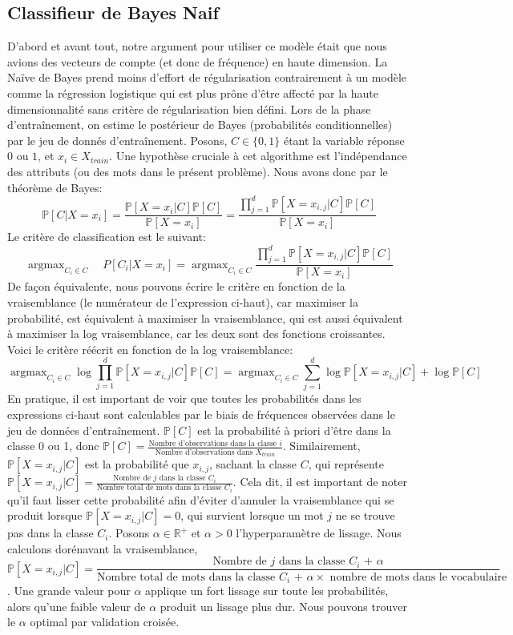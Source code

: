 \documentclass{article}
\DeclareMathOperator*{\argmax}{argmax}
\begin{document}
\subsection{Classifieur de Bayes Naif}
D'abord et avant tout, notre argument pour utiliser ce modèle était que nous avions des vecteurs de compte (et donc de fréquence) en haute dimension. La Naïve de Bayes prend moins d'effort de régularisation contrairement à un modèle comme la régression logistique qui est plus prône d'être affecté par la haute dimensionnalité sans critère de régularisation bien défini.
Lors de la phase d'entraînement, on estime le postérieur de Bayes (probabilités conditionnelles) par le jeu de donnés d'entraînement. Posons, $C \in \{0, 1\}$ étant la variable réponse $0$ ou $1$, et $x_i \in X_{train}$. Une hypothèse cruciale à cet algorithme est l'indépendance des attributs (ou des mots dans le présent problème). Nous avons donc par le théorème de Bayes:\\
$$\mathbb{P}[C | X=x_i] = \frac{\mathbb{P}[X = x_{i}| C]\mathbb{P}[C]}{\mathbb{P}[X = x_i]} =  \frac{\prod_{j = 1}^{d}\mathbb{P}[X = x_{i,j}| C]\mathbb{P}[C]}{\mathbb{P}[X = x_i]}$$
Le critère de classification est le suivant:
$$\argmax_{C_i \in C} \quad P[C_i | X = x_i] = \argmax_{C_i \in C} \frac{\prod_{j = 1}^{d}\mathbb{P}[X = x_{i,j}| C]\mathbb{P}[C]}{\mathbb{P}[X = x_i]}$$
De façon équivalente, nous pouvons écrire le critère en fonction de la vraisemblance (le numérateur de l'expression ci-haut), car maximiser la probabilité, est équivalent à maximiser la vraisemblance, qui est aussi équivalent à maximiser la log vraisemblance, car les deux sont des fonctions croissantes. Voici le critère réécrit en fonction de la log vraisemblance:
$$\argmax_{C_i \in C} \log{\prod_{j = 1}^{d}\mathbb{P}[X = x_{i,j}| C]\mathbb{P}[C]} = \argmax_{C_i \in C} \sum_{j = 1}^{d} \log{\mathbb{P}[X = x_{i,j}| C]} + \log{\mathbb{P}[C]}$$
En pratique, il est important de voir que toutes les probabilités dans les expressions ci-haut sont calculables par le biais de fréquences observées dans le jeu de données d'entraînement. $\mathbb{P}[C]$ est la probabilité à priori d'être dans la classe 0 ou 1, donc $\mathbb{P}[C] = \frac{\text{Nombre d'observations dans la classe $i$}}{\text{Nombre d'observations dans $X_{train}$}}$. Similairement, $\mathbb{P}[X = x_{i, j}| C]$ est la probabilité que $x_{i, j}$, sachant la classe $C$, qui représente $\mathbb{P}[X = x_{i, j}| C] = \frac{\text{Nombre de $j$ dans la classe $C_i$}}{\text{Nombre total de mots dans la classe $C_i$}}$. Cela dit, il est important de noter qu'il faut lisser cette probabilité afin d'éviter d'annuler la vraisemblance qui se produit lorsque $\mathbb{P}[X = x_{i, j}| C] = 0$, qui survient lorsque un mot $j$ ne se trouve pas dans la classe $C_i$. Posons $\alpha \in \mathbb{R}^{+}$ et $\alpha > 0$ l'hyperparamètre de lissage. Nous calculons dorénavant la vraisemblance, $$\mathbb{P}[X = x_{i, j}| C] = \frac{\text{Nombre de $j$ dans la classe $C_i$ + $\alpha$}}{\text{Nombre total de mots dans la classe $C_i$ + $\alpha \times$ nombre de mots dans le vocabulaire}}$$. Une grande valeur pour $\alpha$ applique un fort lissage sur toute les probabilités, alors qu'une faible valeur de $\alpha$ produit un lissage plus dur. Nous pouvons trouver le $\alpha$ optimal par validation croisée. 
\end{document}
